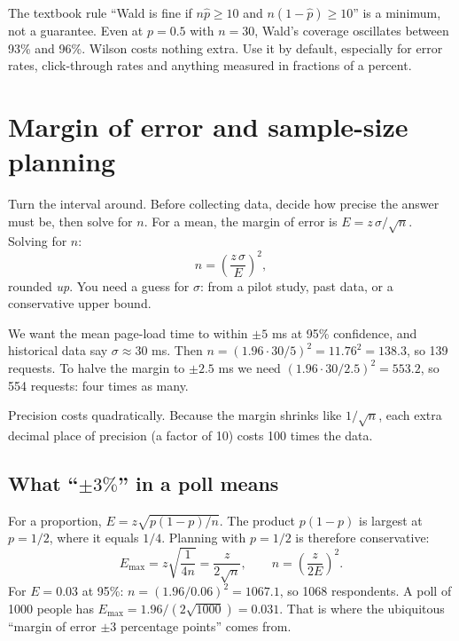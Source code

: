 \begin{trapbox}
The textbook rule ``Wald is fine if $n\hat p \ge 10$ and $n(1-\hat p)\ge
10$'' is a minimum, not a guarantee. Even at $p=0.5$ with $n=30$, Wald's
coverage oscillates between 93\% and 96\%. Wilson costs nothing extra. Use it
by default, especially for error rates, click-through rates and anything
measured in fractions of a percent.
\end{trapbox}

\section{Margin of error and sample-size planning}
\label{sec:ci-sample-size}

Turn the interval around. Before collecting data, decide how precise the
answer must be, then solve for $n$. For a mean, the margin of error is
$E = z\,\sigma/\sqrt n$. Solving for $n$:
\[
  n = \left(\frac{z\,\sigma}{E}\right)^2,
\]
rounded \emph{up}. You need a guess for $\sigma$: from a pilot study, past
data, or a conservative upper bound.

\begin{example}
We want the mean page-load time to within $\pm 5$ ms at 95\% confidence, and
historical data say $\sigma \approx 30$ ms. Then
$n = (1.96\cdot 30/5)^2 = 11.76^2 = 138.3$, so 139 requests. To halve the
margin to $\pm 2.5$ ms we need $(1.96\cdot 30/2.5)^2 = 553.2$, so 554
requests: four times as many.
\end{example}

\begin{intuitionbox}
Precision costs quadratically. Because the margin shrinks like $1/\sqrt n$,
each extra decimal place of precision (a factor of 10) costs 100 times the
data.
\end{intuitionbox}

\subsection{What ``$\pm 3\%$'' in a poll means}

For a proportion, $E = z\sqrt{p(1-p)/n}$. The product $p(1-p)$ is largest at
$p=1/2$, where it equals $1/4$. Planning with $p=1/2$ is therefore
conservative:
\[
  E_{\max} = z\sqrt{\frac{1}{4n}} = \frac{z}{2\sqrt n}, \qquad
  n = \left(\frac{z}{2E}\right)^2.
\]
For $E = 0.03$ at 95\%: $n = (1.96/0.06)^2 = 1067.1$, so 1068 respondents. A
poll of 1000 people has $E_{\max} = 1.96/(2\sqrt{1000}) = 0.031$. That is
where the ubiquitous ``margin of error $\pm 3$ percentage points'' comes from.

